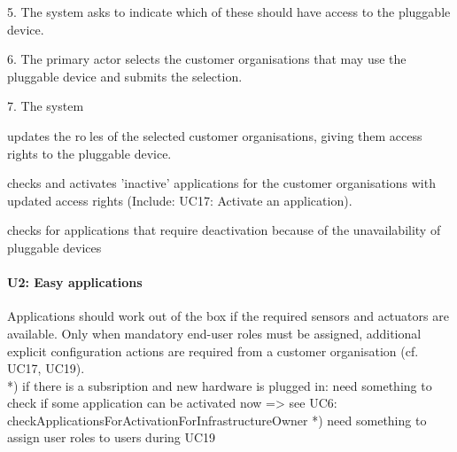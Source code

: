             5. The system asks to indicate which of these should have access to the pluggable device.

            6. The primary actor selects the customer organisations that may use the pluggable device and submits the selection.

            7. The system
                { updates the roles of the selected customer organisations, giving them access rights to the pluggable device.
                { checks and activates 'inactive' applications for the customer organisations with updated access rights (Include: UC17: Activate an application).
                { checks for applications that require deactivation because of the unavailability of pluggable devices


    \paragraph{U2: Easy applications}
        Applications should work out of the box if the required sensors and
        actuators are available. Only when mandatory end-user roles must be
        assigned, additional explicit configuration actions are required
        from a customer organisation (cf. UC17, UC19). \\
        *) if there is a subsription and new hardware is plugged in: need something to check
           if some application can be activated now => see UC6: checkApplicationsForActivationForInfrastructureOwner
        *) need something to assign user roles to users during UC19

}}}
